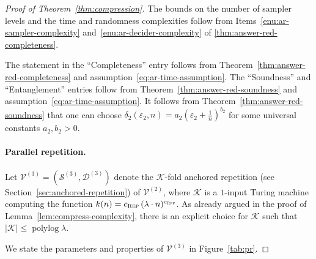 \documentclass[11pt]{article}
\theoremstyle{definition}
\newcommand{\eps}{\varepsilon}
\DeclareMathOperator{\polylog}{polylog}
\newcommand{\sampler}{\mathcal{S}}
\newcommand{\decider}{\mathcal{D}}
\newcommand{\verifier}{\mathcal{V}}
\newcommand{\gamestyle}[1]{\ensuremath{\textsc{#1}}\xspace}
\renewcommand{\cal}[1]{\mathcal{#1}}
\newcommand{\rep}{\gamestyle{Rep}}
\begin{document}
\begin{proof}[Proof of Theorem~\ref{thm:compression}]
  The bounds on the number of sampler levels and the time and randomness
  complexities follow from Items~\ref{enu:ar-sampler-complexity}
  and~\ref{enu:ar-decider-complexity} of \cref{thm:answer-red-completeness}.

  The statement in the ``Completeness'' entry follows from
  Theorem~\ref{thm:answer-red-completeness} and
  assumption~\eqref{eq:ar-time-assumption}.
  The ``Soundness'' and ``Entanglement'' entries follow from
  Theorem~\ref{thm:answer-red-soundness} and
  assumption~\eqref{eq:ar-time-assumption}.
  It follows from Theorem~\ref{thm:answer-red-soundness} that one can choose
  $\delta_2(\eps_2,n) = a_2 \left(\eps_2 + \frac{1}{n} \right)^{b_2}$ for some
  universal constants $a_2, b_2 > 0$.

  \paragraph{Parallel repetition.}
  Let $\verifier^{(3)} = (\sampler^{(3)},\decider^{(3)})$ denote the
  $\cal{K}$-fold anchored repetition (see Section~\ref{sec:anchored-repetition})
  of $\verifier^{(2)}$, where $\cal{K}$ is a $1$-input Turing machine computing
  the function $k(n) = c_\rep \, (\lambda \cdot n)^{c_\rep}$.
  As already argued in the proof of Lemma~\ref{lem:compress-complexity}, there
  is an explicit choice for $\cal{K}$ such that $|\cal{K}| \leq \polylog
  \lambda$.

  We state the parameters and properties of $\verifier^{(3)}$ in
  Figure~\ref{tab:pr}.


\end{proof}
\end{document}
